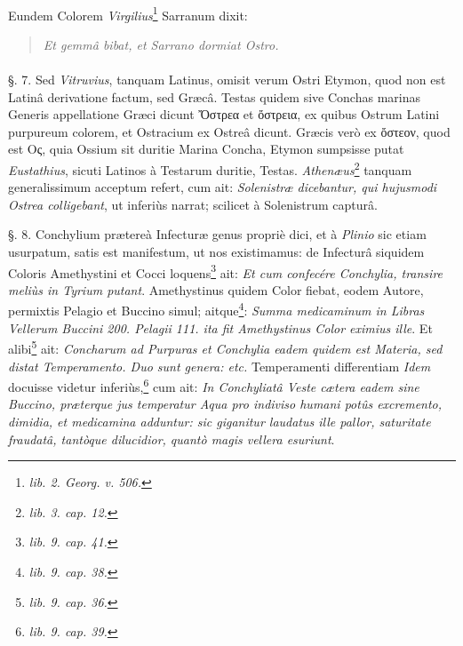 \documentclass[a4paper, 11pt, oneside, polutonikogreek, german]{article}
\begin{document}
\paragraph{}
Eundem Colorem \emph{Virgilius}\footnote{\emph{lib. 2. Georg. v. 506.}} Sarranum dixit:
\begin{quotation}
\emph{Et gemmâ bibat, et Sarrano dormiat Ostro.}
\end{quotation}
\paragraph{}
§. 7. Sed \emph{Vitruvius}, tanquam Latinus, omisit verum Ostri Etymon, quod non est Latinâ derivatione factum, sed Græcâ. Testas quidem sive Conchas marinas Generis appellatione Græci dicunt Ὄστρεα et ὄστρεια, ex quibus Ostrum Latini purpureum colorem, et Ostracium ex Ostreâ dicunt. Græcis verò ex ὄστεον, quod est Ος, quia Ossium sit duritie Marina Concha, Etymon sumpsisse putat \emph{Eustathius}, sicuti Latinos à Testarum duritie, Testas. \emph{Athenæus}\footnote{\emph{lib. 3. cap. 12.}} tanquam generalissimum acceptum refert, cum ait: \emph{Solenistræ dicebantur, qui hujusmodi Ostrea colligebant}, ut inferiùs narrat; scilicet à Solenistrum capturâ.

§. 8. Conchylium prætereà Infecturæ genus propriè dici, et à \emph{Plinio} sic etiam usurpatum, satis est manifestum, ut nos existimamus: de Infecturâ siquidem Coloris Amethystini et Cocci loquens\footnote{\emph{lib. 9. cap. 41.}} ait: \emph{Et cum confecére Conchylia, transire meliùs in Tyrium putant}. Amethystinus quidem Color fiebat, eodem Autore, permixtis Pelagio et Buccino simul; aitque\footnote{\emph{lib. 9. cap. 38.}}: \emph{Summa medicaminum in Libras Vellerum Buccini 200. Pelagii 111. ita fit Amethystinus Color eximius ille}. Et alibi\footnote{\emph{lib. 9. cap. 36.}} ait: \emph{Concharum ad Purpuras et Conchylia eadem quidem est Materia, sed distat Temperamento. Duo sunt genera: etc.} Temperamenti differentiam \emph{Idem} docuisse videtur inferiùs,\footnote{\emph{lib. 9. cap. 39.}} cum ait: \emph{In Conchyliatâ Veste cætera eadem sine Buccino, præterque jus temperatur Aqua pro indiviso humani potûs excremento, dimidia, et medicamina adduntur: sic giganitur laudatus ille pallor, saturitate fraudatâ, tantòque dilucidior, quantò magis vellera esuriunt}.
\end{document}
